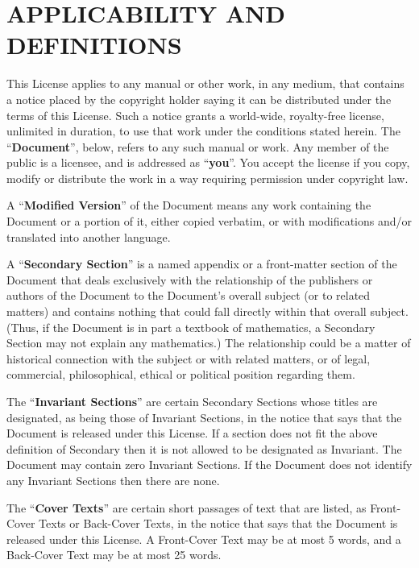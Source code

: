 \documentclass[a4paper,12pt]{book}
\theoremstyle{mes_exemples}	\newtheorem{exemple}[numtho]{Exemple}
\theoremstyle{mes_tho}
\begin{document}
\section{APPLICABILITY AND DEFINITIONS}

This License applies to any manual or other work, in any medium, that
contains a notice placed by the copyright holder saying it can be
distributed under the terms of this License.  Such a notice grants a
world-wide, royalty-free license, unlimited in duration, to use that
work under the conditions stated herein.  The ``\textbf{Document}'', below,
refers to any such manual or work.  Any member of the public is a
licensee, and is addressed as ``\textbf{you}''.  You accept the license if you
copy, modify or distribute the work in a way requiring permission
under copyright law.

A ``\textbf{Modified Version}'' of the Document means any work containing the
Document or a portion of it, either copied verbatim, or with
modifications and/or translated into another language.

A ``\textbf{Secondary Section}'' is a named appendix or a front-matter section of
the Document that deals exclusively with the relationship of the
publishers or authors of the Document to the Document's overall subject
(or to related matters) and contains nothing that could fall directly
within that overall subject.  (Thus, if the Document is in part a
textbook of mathematics, a Secondary Section may not explain any
mathematics.)  The relationship could be a matter of historical
connection with the subject or with related matters, or of legal,
commercial, philosophical, ethical or political position regarding
them.

The ``\textbf{Invariant Sections}'' are certain Secondary Sections whose titles
are designated, as being those of Invariant Sections, in the notice
that says that the Document is released under this License.  If a
section does not fit the above definition of Secondary then it is not
allowed to be designated as Invariant.  The Document may contain zero
Invariant Sections.  If the Document does not identify any Invariant
Sections then there are none.

The ``\textbf{Cover Texts}'' are certain short passages of text that are listed,
as Front-Cover Texts or Back-Cover Texts, in the notice that says that
the Document is released under this License.  A Front-Cover Text may
be at most 5 words, and a Back-Cover Text may be at most 25 words.
\end{document}

